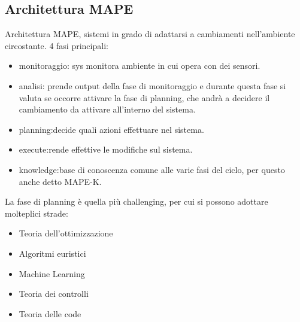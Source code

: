 \documentclass[16px]{article}
\begin{document}
\subsection{Architettura MAPE}
Architettura MAPE, sistemi in grado di adattarsi a cambiamenti nell'ambiente circostante. 4 fasi principali:\\
\begin{itemize}
\item monitoraggio: sys monitora ambiente in cui opera con dei sensori.
\item analisi: prende output della fase di monitoraggio e durante questa fase si valuta se occorre attivare la fase di planning, che andrà a decidere il cambiamento da attivare all'interno del sistema.
\item planning:decide quali azioni effettuare nel sistema.
\item execute:rende effettive le modifiche sul sistema.
\item knowledge:base di conoscenza comune alle varie fasi del ciclo, per questo anche detto MAPE-K.
\end{itemize}
La fase di planning è quella più challenging, per cui si possono adottare molteplici strade:
\begin{itemize}
\item Teoria dell'ottimizzazione
\item Algoritmi euristici
\item Machine Learning
\item Teoria dei controlli
\item Teoria delle code
\end{itemize} 
\end{document}
